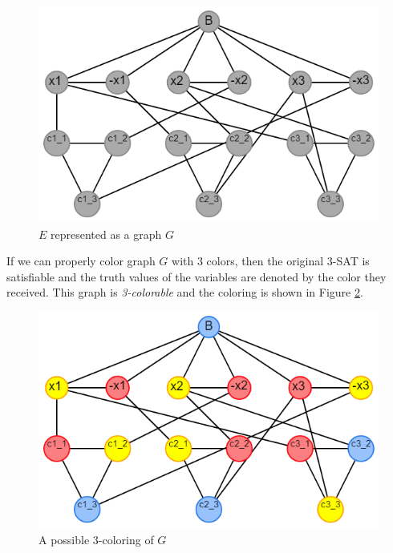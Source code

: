\documentclass{article}
\theoremstyle{definition}
\begin{document}
\begin{figure}[H]
\centering
\includegraphics[scale=0.6]{images/3sat-1.png}
\caption{\(E\) represented as a graph \(G\)}\label{fig:3sat1}
\end{figure}

If we can properly color graph \(G\) with 3 colors, then the original 3-SAT is satisfiable and the truth values of the variables are denoted by the color they received. This graph is \emph{3-colorable} and the coloring is shown in Figure \ref{fig:3sat2}.

\begin{figure}[H]
\centering
\includegraphics[scale=0.6]{images/3sat-2.png}
\caption{A possible 3-coloring of \(G\)}\label{fig:3sat2}
\end{figure}
\end{document}

